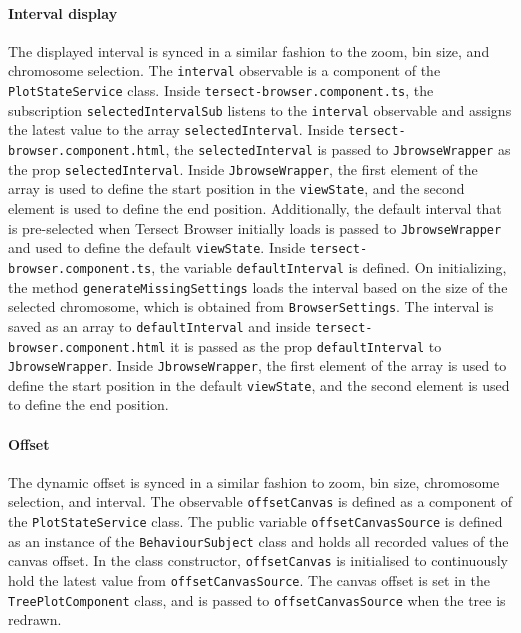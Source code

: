 \documentclass[12pt]{article}
\begin{document}
\begin{itemize}
\paragraph{Interval display}
The displayed interval is synced in a similar fashion to the zoom, bin size, and chromosome selection. The \verb +interval+ observable is a component of the \verb +PlotStateService+ class. Inside \verb +tersect-browser.component.ts+, the subscription \verb +selectedIntervalSub+ listens to the \verb +interval+ observable and assigns the latest value to the array \verb +selectedInterval+. Inside \verb +tersect-browser.component.html+, the \verb +selectedInterval+ is passed to \verb +JbrowseWrapper+ as the prop \verb +selectedInterval+. Inside \verb +JbrowseWrapper+, the first element of the array is used to define the start position in the \verb +viewState+, and the second element is used to define the end position. 
Additionally, the default interval that is pre-selected when Tersect Browser initially loads is passed to \verb +JbrowseWrapper+ and used to define the default \verb +viewState+. Inside \verb +tersect-browser.component.ts+, the variable \verb +defaultInterval+ is defined. On initializing, the method \verb +generateMissingSettings+ loads the interval based on the size of the selected chromosome, which is obtained from \verb +BrowserSettings+. The interval is saved as an array to \verb +defaultInterval+ and inside \verb +tersect-browser.component.html+ it is passed as the prop \verb +defaultInterval+ to \verb +JbrowseWrapper+. Inside \verb +JbrowseWrapper+, the first element of the array is used to define the start position in the default \verb +viewState+, and the second element is used to define the end position. 

\paragraph{Offset}
The dynamic offset is synced in a similar fashion to zoom, bin size, chromosome selection, and interval. The observable \verb +offsetCanvas+ is defined as a component of the \verb +PlotStateService+ class. The public variable \verb +offsetCanvasSource+ is defined as an instance of the \verb +BehaviourSubject+ class and holds all recorded values of the canvas offset. In the class constructor, \verb +offsetCanvas+ is initialised to continuously hold the latest value from \verb +offsetCanvasSource+. The canvas offset is set in the \verb +TreePlotComponent+ class, and is passed to \verb +offsetCanvasSource+ when the tree is redrawn. 


\end{itemize}
\end{document}

